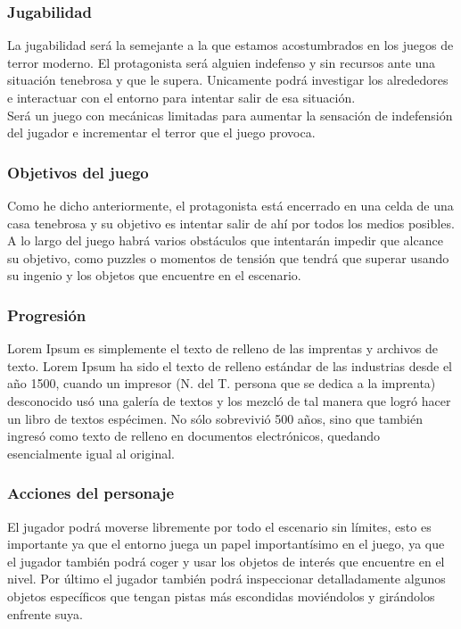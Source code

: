 \subsubsection{Jugabilidad}

La jugabilidad será la semejante a la que estamos acostumbrados en los juegos de terror moderno. El protagonista será alguien indefenso y sin recursos ante una situación tenebrosa y que le supera. Unicamente podrá investigar los alrededores e interactuar con el entorno para intentar salir de esa situación. 
\\

Será un juego con mecánicas limitadas para aumentar la sensación de indefensión del jugador e incrementar el terror que el juego provoca.
\\

\subsubsection{Objetivos del juego}

Como he dicho anteriormente, el protagonista está encerrado en una celda de una casa tenebrosa y su objetivo es intentar salir de ahí por todos los medios posibles. A lo largo del juego habrá varios obstáculos que intentarán impedir que alcance su objetivo, como puzzles o momentos de tensión que tendrá que superar usando su ingenio y los objetos que encuentre en el escenario.
\\

\subsubsection{Progresión}

Lorem Ipsum es simplemente el texto de relleno de las imprentas y archivos de texto. Lorem Ipsum ha sido el texto de relleno estándar de las industrias desde el año 1500, cuando un impresor (N. del T. persona que se dedica a la imprenta) desconocido usó una galería de textos y los mezcló de tal manera que logró hacer un libro de textos espécimen. No sólo sobrevivió 500 años, sino que también ingresó como texto de relleno en documentos electrónicos, quedando esencialmente igual al original.
\\

\subsubsection{Acciones del personaje}

El jugador podrá moverse libremente por todo el escenario sin límites, esto es importante ya que el entorno juega un papel importantísimo en el juego, ya que el jugador también podrá coger y usar los objetos de interés que encuentre en el nivel. Por último el jugador también podrá inspeccionar detalladamente algunos objetos específicos que tengan pistas más escondidas moviéndolos y girándolos enfrente suya.
\\

